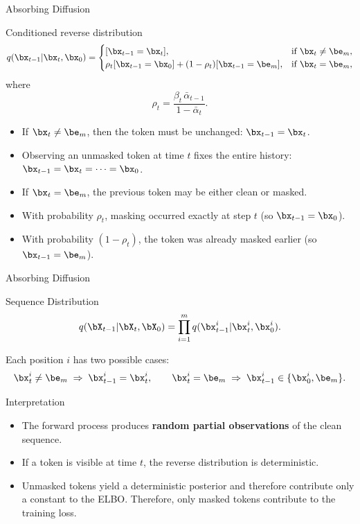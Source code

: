 \documentclass{beamer}
\begin{document}
\begin{frame}{Absorbing Diffusion}
	\begin{block}{Conditioned reverse distribution}
		\vspace{-0.5cm}
		\[
			q(\bx_{t-1} | \bx_t, \bx_0) =
			\begin{cases}
				[\bx_{t-1} = \bx_t], 
				& \text{if } \bx_t \neq \be_m, \\
				\rho_t[\bx_{t-1} = \bx_0] + (1-\rho_t)[\bx_{t-1} = \be_m], 
				& \text{if } \bx_t = \be_m,
			\end{cases}
		\]
		where
		\[
		\rho_t = \frac{\beta_t\,\bar\alpha_{t-1}}{1-\bar\alpha_t}.
		\]
	\end{block}
	\eqpause
	\begin{itemize}
		\item If $\bx_t \neq \be_m$, then the token must be unchanged:
		$\bx_{t-1} = \bx_t$.
		\item Observing an unmasked token at time $t$ fixes the entire history:
		$\bx_{t-1} = \bx_t = \cdots = \bx_0$.
		\eqpause
		\item If $\bx_t = \be_m$, the previous token may be either clean or masked.
		\item With probability $\rho_t$, masking occurred exactly at step $t$
		(so $\bx_{t-1} = \bx_0$).
        \item With probability $(1 - \rho_t)$, the token was already masked earlier
		(so $\bx_{t-1} = \be_m$).
	\end{itemize}
\end{frame}
\begin{frame}{Absorbing Diffusion}
    \begin{block}{Sequence Distribution}
        \vspace{-0.3cm}
        \[
            q(\bX_{t-1} | \bX_t,\bX_0)
            =
            \prod_{i=1}^m q(\bx_{t-1}^i | \bx_t^i, \bx_0^i).
        \]
    \end{block}
	Each position $i$ has two possible cases:
	\[
		\bx_t^i \neq \be_m
		\;\Rightarrow\;
		\bx_{t-1}^i = \bx_t^i,
		\qquad
		\bx_t^i = \be_m
		\;\Rightarrow\;
		\bx_{t-1}^i \in \{\bx_0^i, \be_m\}.
	\]
    \vspace{-0.5cm}
    \eqpause
    \begin{block}{Interpretation}
        \begin{itemize}
            \item The forward process produces \textbf{random partial observations} of the clean sequence.
            \item If a token is visible at time $t$, the reverse distribution is deterministic.
            \item Unmasked tokens yield a deterministic posterior and therefore contribute only a constant to the ELBO. Therefore, only masked tokens contribute to the training loss.
        \end{itemize}
    \end{block}
\end{frame}
\end{document}
